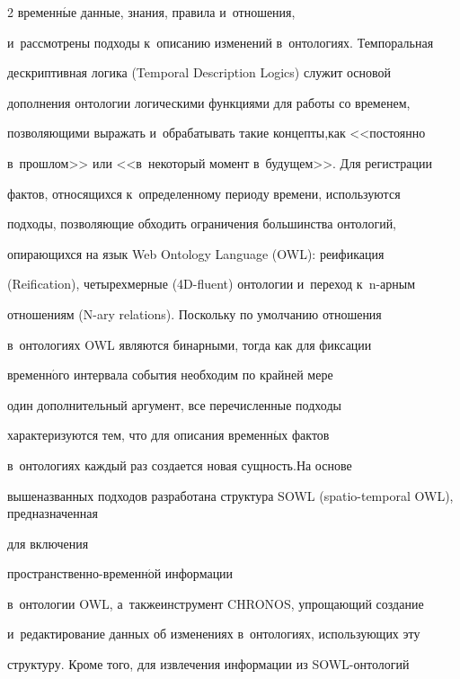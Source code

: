 \begin{multicols}{2}
временн$\acute{\mbox{ы}}$е данные, знания, правила и~отношения, 


и~рассмотрены подходы к~описанию изменений в~онтологиях. Темпоральная 


дескриптивная логика (Temporal Description Logics) служит основой 


дополнения онтологии логическими функциями для работы со временем, 


поз\-во\-ля\-ющи\-ми выражать и~обрабатывать такие концепты,\linebreak как <<постоянно 


в~прошлом>> или <<в~некоторый момент в~будущем>>. Для регистрации 


фактов, относящихся к~определенному периоду времени, используются 


подходы, позволяющие обходить \mbox{ограничения} большинства онтологий, 


опирающихся на язык Web Ontology Language (OWL): реификация 


(Reification), четырехмерные (4D-fluent) онтологии и~переход к~n-ар\-ным 


отношениям (N-ary relations). Поскольку по умолчанию отношения 


в~онтологиях OWL являются бинарными, тогда как для фиксации 


временн$\acute{\mbox{о}}$го интервала события необходим по крайней мере 


один дополнительный аргумент, все перечисленные подходы 


характеризуются тем, что для описания временн$\acute{\mbox{ы}}$х фактов 


в~онтологиях каждый раз создается новая сущность.\linebreak На основе 


вышеназванных подходов разработана структура SOWL (spatio-temporal OWL), пред\-на\-значенная 


для включения %


про\-стран\-ст\-вен\-но-вре\-мен\-н$\acute{\mbox{о}}$й информации 


в~онтологии OWL, а~также\linebreak инструмент CHRONOS, упро\-ща\-ющий создание 


и~редактирование данных об \mbox{изменениях} в~онтологиях, ис\-поль\-зу\-ющих эту 


структуру. Кроме того, для извлечения информации из SOWL-он\-то\-ло\-гий 



\end{multicols}

